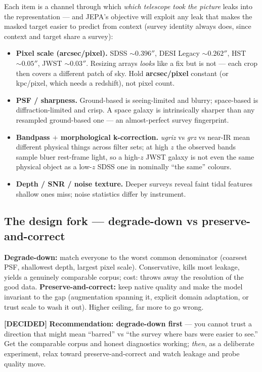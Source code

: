 \documentclass[11pt,a4paper]{article}
\newcommand{\dec}{\textcolor{decided}{\sffamily\bfseries[DECIDED]}}
\begin{document}
Each item is a channel through which \emph{which telescope took the picture} leaks into the
representation --- and JEPA's objective will exploit any leak that makes the masked target
easier to predict from context (survey identity always does, since context and target share a
survey):
\begin{itemize}[leftmargin=1.4em,itemsep=2pt]
\item \textbf{Pixel scale (arcsec/pixel).} SDSS ${\sim}0.396''$, DESI Legacy ${\sim}0.262''$,
HST ${\sim}0.05''$, JWST ${\sim}0.03''$. Resizing arrays \emph{looks} like a fix but is not ---
each crop then covers a different patch of sky. Hold \textbf{arcsec/pixel} constant (or
kpc/pixel, which needs a redshift), not pixel count.
\item \textbf{PSF / sharpness.} Ground-based is seeing-limited and blurry; space-based is
diffraction-limited and crisp. A space galaxy is intrinsically sharper than any resampled
ground-based one --- an almost-perfect survey fingerprint.
\item \textbf{Bandpass $+$ morphological k-correction.} \emph{ugriz} vs \emph{grz} vs near-IR
mean different physical things across filter sets; at high $z$ the observed bands sample bluer
rest-frame light, so a high-$z$ JWST galaxy is not even the same physical object as a low-$z$
SDSS one in nominally ``the same'' colours.
\item \textbf{Depth / SNR / noise texture.} Deeper surveys reveal faint tidal features shallow
ones miss; noise statistics differ by instrument.
\end{itemize}

\subsection{The design fork --- degrade-down vs preserve-and-correct}

\textbf{Degrade-down:} match everyone to the worst common denominator (coarsest PSF, shallowest
depth, largest pixel scale). Conservative, kills most leakage, yields a genuinely comparable
corpus; cost: throws away the resolution of the good data. \textbf{Preserve-and-correct:} keep
native quality and make the model invariant to the gap (augmentation spanning it, explicit
domain adaptation, or trust scale to wash it out). Higher ceiling, far more to go wrong.

\dec{} \textbf{Recommendation: degrade-down first} --- you cannot trust a direction that might
mean ``barred'' vs ``the survey where bars were easier to see.'' Get the comparable corpus and
honest diagnostics working; \emph{then}, as a deliberate experiment, relax toward
preserve-and-correct and watch leakage and probe quality move.
\end{document}
